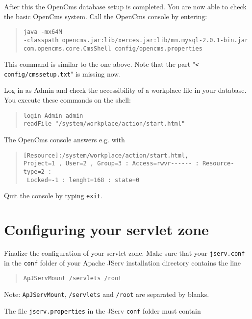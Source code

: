 After this the OpenCms database setup is completed. You are now able to check the basic OpenCms system. 
Call the OpenCms console by entering:

\begin{quote}
\texttt{java -mx64M\\
-classpath opencms.jar:lib/xerces.jar:lib/mm.mysql-2.0.1-bin.jar\\
com.opencms.core.CmsShell config/opencms.properties}
\end{quote}

This command is similar to the one above.
Note that the part "\texttt{< config/cmssetup.txt}" is missing now.

Log in as Admin and check the accessibility of a workplace file in your database. 
You execute these commands on the shell: 

\begin{quote}
\texttt{login Admin admin\\
readFile "/system/workplace/action/start.html"}
\end{quote}

The OpenCms console answers e.g. with

\begin{quote}
\begin{verbatim}
[Resource]:/system/workplace/action/start.html,
Project=1 , User=2 , Group=3 : Access=rwvr------ : Resource-type=2 : 
 Locked=-1 : lenght=168 : state=0
\end{verbatim}
\end{quote}

Quit the console by typing \texttt{exit}.

\section{Configuring your servlet zone}
Finalize the configuration of your servlet zone. Make sure that your \texttt{jserv.conf} in 
the \texttt{conf} folder of your Apache JServ installation directory contains the line

\begin{quote}
\begin{verbatim}
ApJServMount /servlets /root
\end{verbatim}
\end{quote}

Note: \texttt{ApJServMount}, \texttt{/servlets} and \texttt{/root} are separated by blanks.

The file \texttt{jserv.properties} in the JServ \texttt{conf} folder must contain

